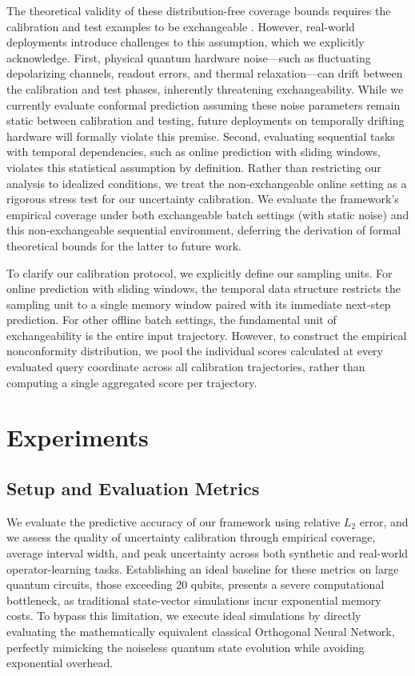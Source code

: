 \documentclass{iopjournal}
\begin{document}
The theoretical validity of these distribution-free coverage bounds requires the calibration and test examples to be exchangeable \cite{angelopoulous2023conformal, shafer2008conformaltutorial}. However, real-world deployments introduce challenges to this assumption, which we explicitly acknowledge. First, physical quantum hardware noise—such as fluctuating depolarizing channels, readout errors, and thermal relaxation—can drift between the calibration and test phases, inherently threatening exchangeability. While we currently evaluate conformal prediction assuming these noise parameters remain static between calibration and testing, future deployments on temporally drifting hardware will formally violate this premise. Second, evaluating sequential tasks with temporal dependencies, such as online prediction with sliding windows, violates this statistical assumption by definition. Rather than restricting our analysis to idealized conditions, we treat the non-exchangeable online setting as a rigorous stress test for our uncertainty calibration. We evaluate the framework's empirical coverage under both exchangeable batch settings (with static noise) and this non-exchangeable sequential environment, deferring the derivation of formal theoretical bounds for the latter to future work.

To clarify our calibration protocol, we explicitly define our sampling units. For online prediction with sliding windows, the temporal data structure restricts the sampling unit to a single memory window paired with its immediate next-step prediction. For other offline batch settings, the fundamental unit of exchangeability is the entire input trajectory. However, to construct the empirical nonconformity distribution, we pool the individual scores calculated at every evaluated query coordinate across all calibration trajectories, rather than computing a single aggregated score per trajectory.



\section{Experiments}
\label{sec:experiments}

\subsection{Setup and Evaluation Metrics}

We evaluate the predictive accuracy of our framework using relative $L_2$ error, and we assess the quality of uncertainty calibration through empirical coverage, average interval width, and peak uncertainty across both synthetic and real-world operator-learning tasks. Establishing an ideal baseline for these metrics on large quantum circuits, those exceeding 20 qubits, presents a severe computational bottleneck, as traditional state-vector simulations incur exponential memory costs. To bypass this limitation, we execute ideal simulations by directly evaluating the mathematically equivalent classical Orthogonal Neural Network, perfectly mimicking the noiseless quantum state evolution while avoiding exponential overhead.
\end{document}
